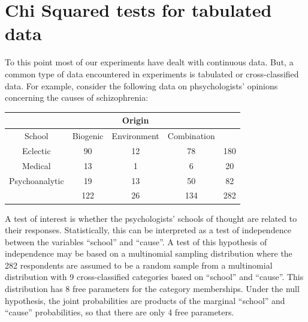 \documentclass[
]{book}
\begin{document}
\hypertarget{chi-squared-tests-for-tabulated-data}{%
\section{Chi Squared tests for tabulated data}\label{chi-squared-tests-for-tabulated-data}}

To this point most of our experiments have dealt with continuous data. But, a common type of data encountered in experiments is tabulated or cross-classified data. For example, consider the following data on phsychologists' opinions concerning the causes of schizophrenia:

\begin{longtable}[]{@{}ccccc@{}}
\toprule
& & Origin & & \\
\midrule
\endhead
School & Biogenic & Environment & Combination & \\
Eclectic & 90 & 12 & 78 & 180 \\
Medical & 13 & 1 & 6 & 20 \\
Psychoanalytic & 19 & 13 & 50 & 82 \\
& 122 & 26 & 134 & 282 \\
\bottomrule
\end{longtable}

A test of interest is whether the psychologists' schools of thought are related to their responses. Statistically, this can be interpreted as a test of independence between the variables ``school'' and ``cause''. A test of this hypothesis of independence may be based on a multinomial sampling distribution where the 282 respondents are assumed to be a random sample from a multinomial distribution with 9 cross-classified categories based on ``school'' and ``cause''. This distribution has 8 free parameters for the category memberships. Under the null hypothesis, the joint probabilities are products of the marginal ``school'' and ``cause'' probabilities, so that there are only 4 free parameters.
\end{document}
